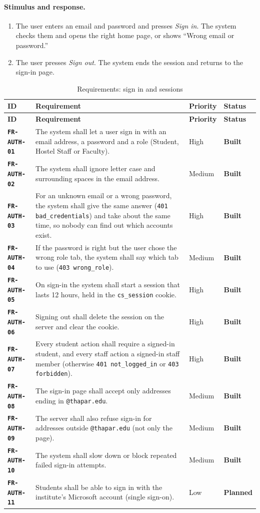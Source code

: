\documentclass[11pt,a4paper,parskip=half,toc=listof]{scrreprt}
\newcommand{\Built}{\textcolor{builtgreen}{\textbf{Built}}}
\newcommand{\Planned}{\textcolor{plannedamber}{\textbf{Planned}}}
\newcommand{\Req}[1]{\textbf{\texttt{#1}}}
\newcommand{\ReqHeader}{%
  \toprule
  \textbf{ID} & \textbf{Requirement} & \textbf{Priority} & \textbf{Status}\\
  \midrule}
\begin{document}
\paragraph{Stimulus and response.}
\begin{enumerate}
  \item The user enters an email and password and presses \emph{Sign in}.
    The system checks them and opens the right home page, or shows
    ``Wrong email or password.''
  \item The user presses \emph{Sign out}. The system ends the session and
    returns to the sign-in page.
\end{enumerate}

\begin{xltabular}{\linewidth}{@{}L{2.25cm}YL{1.55cm}L{1.6cm}@{}}
  \caption{Requirements: sign in and sessions}\label{tab:fr-auth}\\
  \ReqHeader
  \endfirsthead
  \ReqHeader
  \endhead
  \bottomrule
  \endlastfoot
  \Req{FR-AUTH-01} & The system shall let a user sign in with an email
    address, a password and a role (Student, Hostel Staff or Faculty). & High &
    \Built\\
  \Req{FR-AUTH-02} & The system shall ignore letter case and surrounding
    spaces in the email address. & Medium & \Built\\
  \Req{FR-AUTH-03} & For an unknown email or a wrong password, the system
    shall give the same answer (\texttt{401 bad\_credentials}) and take
    about the same time, so nobody can find out which accounts exist. &
    High & \Built\\
  \Req{FR-AUTH-04} & If the password is right but the user chose the
    wrong role tab, the system shall say which tab to use
    (\texttt{403 wrong\_role}). & Medium & \Built\\
  \Req{FR-AUTH-05} & On sign-in the system shall start a session that
    lasts 12 hours, held in the \texttt{cs\_session} cookie. & High &
    \Built\\
  \Req{FR-AUTH-06} & Signing out shall delete the session on the server and
    clear the cookie. & High & \Built\\
  \Req{FR-AUTH-07} & Every student action shall require a signed-in
    student, and every staff action a signed-in staff member
    (otherwise \texttt{401 not\_logged\_in} or \texttt{403 forbidden}). &
    High & \Built\\
  \Req{FR-AUTH-08} & The sign-in page shall accept only addresses ending in
    \texttt{@thapar.edu}. & Medium & \Built\\
  \Req{FR-AUTH-09} & The server shall also refuse sign-in for addresses
    outside \texttt{@thapar.edu} (not only the page). &
    Medium & \Built\\
  \Req{FR-AUTH-10} & The system shall slow down or block repeated failed
    sign-in attempts. & Medium & \Built\\
  \Req{FR-AUTH-11} & Students shall be able to sign in with the
    institute's Microsoft account (single sign-on). & Low & \Planned\\
\end{xltabular}
\end{document}
